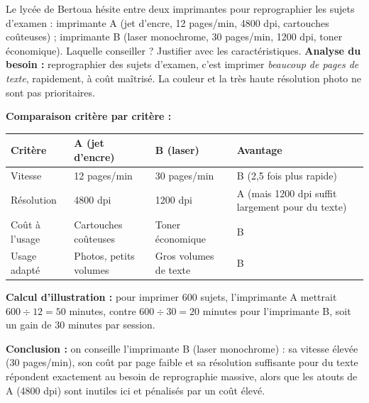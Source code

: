 \documentclass[11pt]{article}
\newcommand{\cle}[1]{{\popxbold\color{popdark}#1}}
\begin{document}
\begin{exoresolu}
Le lycée de Bertoua hésite entre deux imprimantes pour reprographier les sujets d'examen : imprimante A (jet d'encre, 12 pages/min, 4800 dpi, cartouches coûteuses) ; imprimante B (laser monochrome, 30 pages/min, 1200 dpi, toner économique). Laquelle conseiller ? Justifier avec les caractéristiques.
\tcblower
\textbf{Analyse du besoin :} reprographier des sujets d'examen, c'est imprimer \emph{beaucoup de pages de texte}, rapidement, à coût maîtrisé. La couleur et la très haute résolution photo ne sont pas prioritaires.

\textbf{Comparaison critère par critère :}
\begin{center}
\begin{tabularx}{\linewidth}{|l|X|X|X|}
\hline
\rowcolor{popblueL} \textbf{Critère} & \textbf{A (jet d'encre)} & \textbf{B (laser)} & \textbf{Avantage} \\
\hline
Vitesse & 12 pages/min & 30 pages/min & B (2,5 fois plus rapide) \\
\hline
Résolution & 4800 dpi & 1200 dpi & A (mais 1200 dpi suffit largement pour du texte) \\
\hline
Coût à l'usage & Cartouches coûteuses & Toner économique & B \\
\hline
Usage adapté & Photos, petits volumes & Gros volumes de texte & B \\
\hline
\end{tabularx}
\end{center}

\textbf{Calcul d'illustration :} pour imprimer 600 sujets, l'imprimante A mettrait $600 \div 12 = 50$ minutes, contre $600 \div 30 = 20$ minutes pour l'imprimante B, soit un gain de 30 minutes par session.

\textbf{Conclusion :} on conseille l'\cle{imprimante B} (laser monochrome) : sa vitesse élevée (30 pages/min), son coût par page faible et sa résolution suffisante pour du texte répondent exactement au besoin de reprographie massive, alors que les atouts de A (4800 dpi) sont inutiles ici et pénalisés par un coût élevé.
\end{exoresolu}
\end{document}
